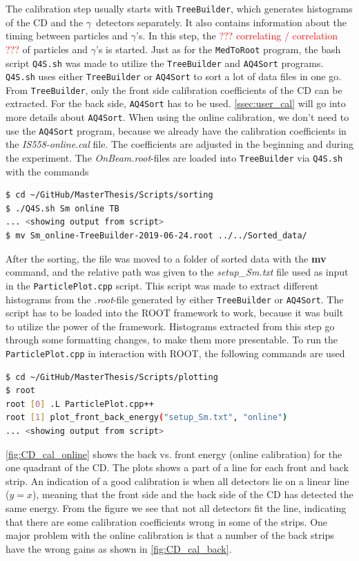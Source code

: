 \documentclass[twoside,english]{uiofysmaster/uiofysmaster}
\newcommand{\ga}{$\gamma$}
\let\orgautoref\autoref
\renewcommand{\autoref}
        {%
		 \def\sectionautorefname{Section}%
		 \def\subsectionautorefname{Section}%
		 \def\subsubsectionautorefname{Section}%
		 \def\chapterautorefname{Chapter}%
          \orgautoref}
\begin{document}
The calibration step usually starts with \texttt{TreeBuilder}, which generates histograms of the CD and the \ga\ detectors separately. 
It also contains information about the timing between particles and \ga's. 
In this step, the \textcolor{red}{??? correlating / correlation ???} of particles and \ga's is started.
Just as for the \texttt{MedToRoot} program, the bash script \texttt{Q4S.sh} was made to utilize the \texttt{TreeBuilder} and \texttt{AQ4Sort} programs. 
\texttt{Q4S.sh} uses either \texttt{TreeBuilder} or \texttt{AQ4Sort} to sort a lot of data files in one go.
From \texttt{TreeBuilder}, only the front side calibration coefficients of the CD can be extracted. 
For the back side, \texttt{AQ4Sort} has to be used.
\autoref{ssec:user_cal} will go into more details about \texttt{AQ4Sort}.
When using the online calibration, we don't need to use the \texttt{AQ4Sort} program, because we already have the calibration coefficients in the \textit{IS558-online.cal} file. 
The coefficients are adjusted in the beginning and during the experiment.
The \textit{OnBeam.root}-files are loaded into \texttt{TreeBuilder} via \texttt{Q4S.sh} with the commands
\begin{lstlisting}[language=sh]
$ cd ~/GitHub/MasterThesis/Scripts/sorting 
$ ./Q4S.sh Sm online TB
... <showing output from script>
$ mv Sm_online-TreeBuilder-2019-06-24.root ../../Sorted_data/
\end{lstlisting}
After the sorting, the file was moved to a folder of sorted data with the \textbf{mv} command, and the relative path was given to the \textit{setup\_Sm.txt} file used as input in the \texttt{ParticlePlot.cpp} script. 
This script was made to extract different histograms from the \textit{.root}-file generated by either \texttt{TreeBuilder} or \texttt{AQ4Sort}.
The script has to be loaded into the ROOT framework to work, because it was built to utilize the power of the framework.
Histograms extracted from this step go through some formatting changes, to make them more presentable.
To run the \texttt{ParticlePlot.cpp} in interaction with ROOT, the following commands are used
\begin{lstlisting}[language=sh]
$ cd ~/GitHub/MasterThesis/Scripts/plotting 
$ root
root [0] .L ParticlePlot.cpp++
root [1] plot_front_back_energy("setup_Sm.txt", "online")
... <showing output from script>
\end{lstlisting}

\autoref{fig:CD_cal_online} shows the back vs. front energy (online calibration) for the one quadrant of the CD. 
The plots shows a part of a line for each front and back strip. An indication of a good calibration is when all detectors lie on a linear line ($y = x$), meaning that the front side and the back side of the CD has detected the same energy. 
From the figure we see that not all detectors fit the line, indicating that there are some calibration coefficients wrong in some of the strips.
One major problem with the online calibration is that a number of the back strips have the wrong gains as shown in \autoref{fig:CD_cal_back}.
\end{document}
